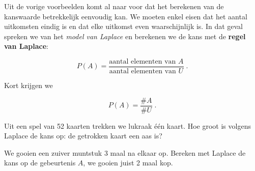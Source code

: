 \documentclass[12pt,twoside]{article}
\begin{document}
Uit de vorige voorbeelden komt al naar voor dat het berekenen van de kanswaarde betrekkelijk eenvoudig kan. We moeten enkel eisen dat het aantal uitkomsten eindig is en dat elke uitkomst even waarschijnlijk is. In dat geval spreken we van het {\em model van Laplace} en berekenen we de kans met de {\bf regel van Laplace}:

$$P(A)=\dfrac{\mbox{aantal elementen van }A}{\mbox{aantal elementen van }U}\;.$$

Kort krijgen we\\
\begin{mdframed}
$$P(A)=\dfrac{\#A}{\#U}\;.$$
\end{mdframed}

\begin{oefening}
Uit een spel van 52 kaarten trekken we lukraak één kaart. Hoe groot is volgens Laplace de kans op: de getrokken kaart een aas is?
\end{oefening}

\begin{oefening}
We gooien een zuiver muntstuk 3 maal na elkaar op. Bereken met Laplace de kans op de gebeurtenis $A$, we gooien juist 2 maal kop.
\end{oefening}
\end{document}
